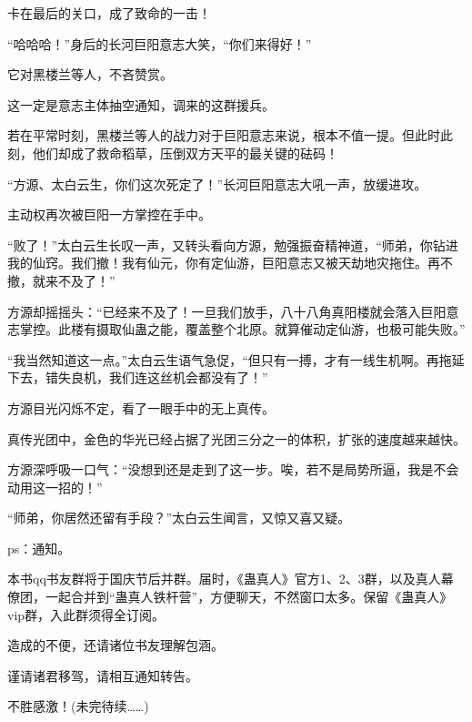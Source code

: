 \begin{this_body}
卡在最后的关口，成了致命的一击！

“哈哈哈！”身后的长河巨阳意志大笑，“你们来得好！”

它对黑楼兰等人，不吝赞赏。

这一定是意志主体抽空通知，调来的这群援兵。

若在平常时刻，黑楼兰等人的战力对于巨阳意志来说，根本不值一提。但此时此刻，他们却成了救命稻草，压倒双方天平的最关键的砝码！

“方源、太白云生，你们这次死定了！”长河巨阳意志大吼一声，放缓进攻。

主动权再次被巨阳一方掌控在手中。

“败了！”太白云生长叹一声，又转头看向方源，勉强振奋精神道，“师弟，你钻进我的仙窍。我们撤！我有仙元，你有定仙游，巨阳意志又被天劫地灾拖住。再不撤，就来不及了！”

方源却摇摇头：“已经来不及了！一旦我们放手，八十八角真阳楼就会落入巨阳意志掌控。此楼有摄取仙蛊之能，覆盖整个北原。就算催动定仙游，也极可能失败。”

“我当然知道这一点。”太白云生语气急促，“但只有一搏，才有一线生机啊。再拖延下去，错失良机，我们连这丝机会都没有了！”

方源目光闪烁不定，看了一眼手中的无上真传。

真传光团中，金色的华光已经占据了光团三分之一的体积，扩张的速度越来越快。

方源深呼吸一口气：“没想到还是走到了这一步。唉，若不是局势所逼，我是不会动用这一招的！”

“师弟，你居然还留有手段？”太白云生闻言，又惊又喜又疑。

ps：通知。

本书qq书友群将于国庆节后并群。届时，《蛊真人》官方1、2、3群，以及真人幕僚团，一起合并到“蛊真人铁杆营”，方便聊天，不然窗口太多。保留《蛊真人》vip群，入此群须得全订阅。

造成的不便，还请诸位书友理解包涵。

谨请诸君移驾，请相互通知转告。

不胜感激！(未完待续……)

\end{this_body}

